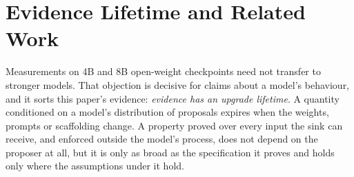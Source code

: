 \section{Evidence Lifetime and Related Work}\label{sec:gaps}

Measurements on 4B and 8B open-weight checkpoints need not transfer to stronger models. That objection is decisive for claims about a model's behaviour, and it sorts this paper's evidence: \emph{evidence has an upgrade lifetime}. A quantity conditioned on a model's distribution of proposals expires when the weights, prompts or scaffolding change. A property proved over every input the sink can receive, and enforced outside the model's process, does not depend on the proposer at all, but it is only as broad as the specification it proves and holds only where the assumptions under it hold.

